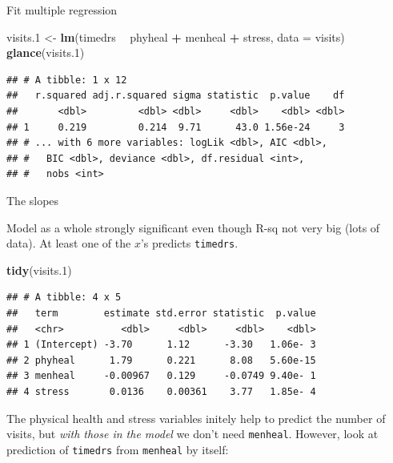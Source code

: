 \documentclass[
  ignorenonframetext,
]{beamer}
\newenvironment{Shaded}{\begin{snugshade}}{\end{snugshade}}
\newcommand{\DataTypeTok}[1]{\textcolor[rgb]{0.13,0.29,0.53}{#1}}
\newcommand{\FloatTok}[1]{\textcolor[rgb]{0.00,0.00,0.81}{#1}}
\newcommand{\KeywordTok}[1]{\textcolor[rgb]{0.13,0.29,0.53}{\textbf{#1}}}
\newcommand{\NormalTok}[1]{#1}
\newcommand{\OperatorTok}[1]{\textcolor[rgb]{0.81,0.36,0.00}{\textbf{#1}}}
\newcommand{\StringTok}[1]{\textcolor[rgb]{0.31,0.60,0.02}{#1}}
\begin{document}
\begin{frame}[fragile]{Fit multiple regression}
\protect\hypertarget{fit-multiple-regression}{}

\begin{Shaded}
\begin{Highlighting}[]
\NormalTok{visits}\FloatTok{.1}\NormalTok{ <-}\StringTok{ }\KeywordTok{lm}\NormalTok{(timedrs }\OperatorTok{~}\StringTok{ }\NormalTok{phyheal }\OperatorTok{+}\StringTok{ }\NormalTok{menheal }\OperatorTok{+}\StringTok{ }\NormalTok{stress,}
  \DataTypeTok{data =}\NormalTok{ visits)}
\KeywordTok{glance}\NormalTok{(visits}\FloatTok{.1}\NormalTok{)}
\end{Highlighting}
\end{Shaded}

\begin{verbatim}
## # A tibble: 1 x 12
##   r.squared adj.r.squared sigma statistic  p.value    df
##       <dbl>         <dbl> <dbl>     <dbl>    <dbl> <dbl>
## 1     0.219         0.214  9.71      43.0 1.56e-24     3
## # ... with 6 more variables: logLik <dbl>, AIC <dbl>,
## #   BIC <dbl>, deviance <dbl>, df.residual <int>,
## #   nobs <int>
\end{verbatim}

\end{frame}

\begin{frame}[fragile]{The slopes}
\protect\hypertarget{the-slopes}{}

Model as a whole strongly significant even though R-sq not very big
(lots of data). At least one of the \(x\)'s predicts \texttt{timedrs}.

\begin{Shaded}
\begin{Highlighting}[]
\KeywordTok{tidy}\NormalTok{(visits}\FloatTok{.1}\NormalTok{)}
\end{Highlighting}
\end{Shaded}

\begin{verbatim}
## # A tibble: 4 x 5
##   term        estimate std.error statistic  p.value
##   <chr>          <dbl>     <dbl>     <dbl>    <dbl>
## 1 (Intercept) -3.70      1.12      -3.30   1.06e- 3
## 2 phyheal      1.79      0.221      8.08   5.60e-15
## 3 menheal     -0.00967   0.129     -0.0749 9.40e- 1
## 4 stress       0.0136    0.00361    3.77   1.85e- 4
\end{verbatim}

The physical health and stress variables initely help to predict the
number of visits, but \emph{with those in the model} we don't need
\texttt{menheal}. However, look at prediction of \texttt{timedrs} from
\texttt{menheal} by itself:

\end{frame}
\end{document}
